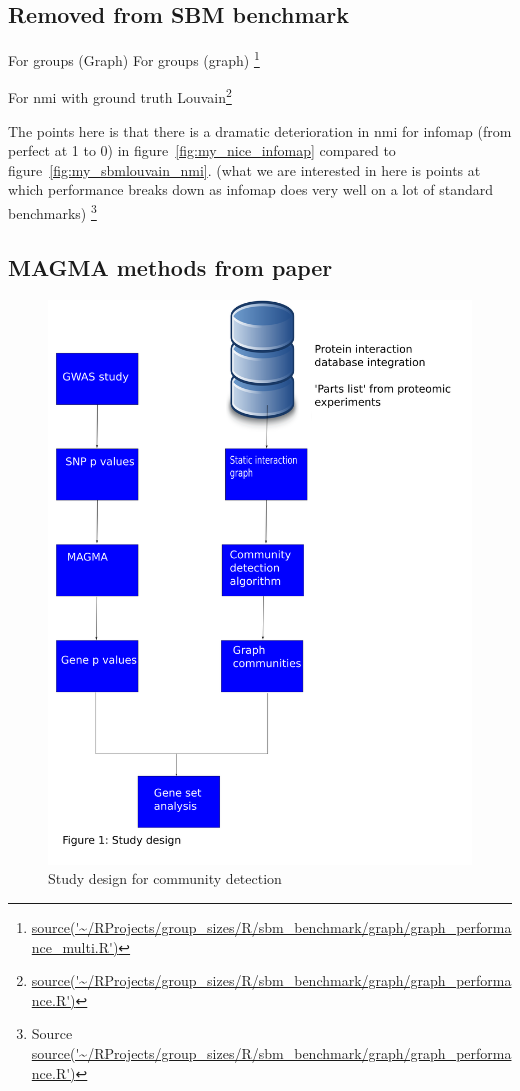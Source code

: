 \subsection{Removed from SBM benchmark}

For groups (Graph)  For groups (graph) \footnote{\url{source('~/RProjects/group_sizes/R/sbm_benchmark/graph/graph_performance_multi.R')}}

For nmi with ground truth Louvain\footnote{\url{source('~/RProjects/group_sizes/R/sbm_benchmark/graph/graph_performance.R')}}

The points here is that there is a dramatic deterioration in nmi for infomap (from perfect at 1 to 0) in figure~\ref{fig:my_nice_infomap} compared to figure~\ref{fig:my_sbmlouvain_nmi}. (what we are interested in here is points at which performance breaks down as infomap does very well on a lot of standard benchmarks)
\footnote{Source \url{source('~/RProjects/group_sizes/R/sbm_benchmark/graph/graph_performance.R')}}
\subsection{MAGMA methods from paper}
\begin{figure}
    \centering
    \includegraphics[width=\textwidth]{images/study_design.png}  
    \caption{Study design for community detection}
    \label{fig:study design community detection}
\end{figure}
